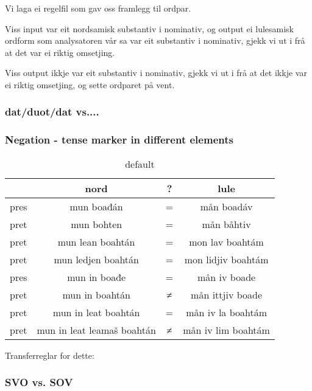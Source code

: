 \documentclass[a4paper,english,12pt]{article}
\begin{document}
Vi laga ei regelfil som gav oss framlegg til ordpar.

Viss input var eit nordsamisk substantiv i nominativ, og output ei lulesamisk ordform som analysatoren vår sa var eit substantiv i nominativ, gjekk vi ut i frå at det var ei riktig omsetjing.

Viss output ikkje var eit substantiv i nominativ, gjekk vi ut i frå at det ikkje var ei riktig omsetjing, og sette ordparet på vent.


\subsubsection{dat/duot/dat vs....}


\subsubsection{Negation - tense marker in different elements}

\begin{table}[htdp]
\caption{default}
\begin{center}
\begin{tabular}{|c|c|c|c|}
\hline
 & nord                            & ? & lule \\
 \hline
 pres & mun boađán                 & = & mån boadáv  \\
 pret & mun bohten                 & = & mån båhtiv     \\
 pret & mun lean boahtán           & = & mon lav boahtám     \\
 pret & mun ledjen boahtán         & = & mon lidjiv boahtám     \\
\hline                       
 pres & mun in boađe               & = & mån iv boade      \\
 pret & mun in boahtán             & ≠ & mån ittjiv boade      \\
 pret & mun in leat boahtán        & = & mån iv la boahtám       \\
 pret & mun in leat leamaš boahtán & ≠ & mån iv lim boahtám       \\
\hline
\end{tabular}
\end{center}
\label{default}
\end{table}%

Transferreglar for dette:





\subsubsection{SVO vs. SOV}
\end{document}

